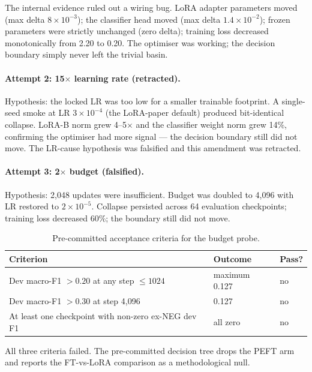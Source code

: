 The internal evidence ruled out a wiring bug. LoRA adapter parameters
moved (max delta $8\times 10^{-3}$); the classifier head moved (max
delta $1.4\times 10^{-2}$); frozen parameters were strictly unchanged
(zero delta); training loss decreased monotonically from 2.20 to
0.20. The optimiser was working; the decision boundary simply never
left the trivial basin.

\paragraph{Attempt 2: 15$\times$ learning rate (retracted).}
Hypothesis: the locked LR was too low for a smaller trainable
footprint. A single-seed smoke at LR $3\times 10^{-4}$ (the
LoRA-paper default) produced bit-identical collapse. LoRA-B norm
grew 4--5$\times$ and the classifier weight norm grew 14\%,
confirming the optimiser had more signal --- the decision boundary
still did not move. The LR-cause hypothesis was falsified and this
amendment was retracted.

\paragraph{Attempt 3: 2$\times$ budget (falsified).}
Hypothesis: 2{,}048 updates were insufficient. Budget was doubled to
4{,}096 with LR restored to $2\times 10^{-5}$. Collapse persisted
across 64 evaluation checkpoints; training loss decreased 60\%; the
boundary still did not move.

\begin{table}[H]
\centering
\caption{Pre-committed acceptance criteria for the budget probe.}
\label{tab:s9-acceptance}
\small
\begin{tabular}{@{}lll@{}}
\toprule
\textbf{Criterion} & \textbf{Outcome} & \textbf{Pass?} \\
\midrule
Dev macro-F1 $> 0.20$ at any step $\le 1024$              & maximum 0.127 & no \\
Dev macro-F1 $> 0.30$ at step 4{,}096                        & 0.127         & no \\
At least one checkpoint with non-zero ex-NEG dev F1       & all zero      & no \\
\bottomrule
\end{tabular}
\end{table}

All three criteria failed. The pre-committed decision tree drops
the PEFT arm and reports the FT-vs-LoRA comparison as a
methodological null.

